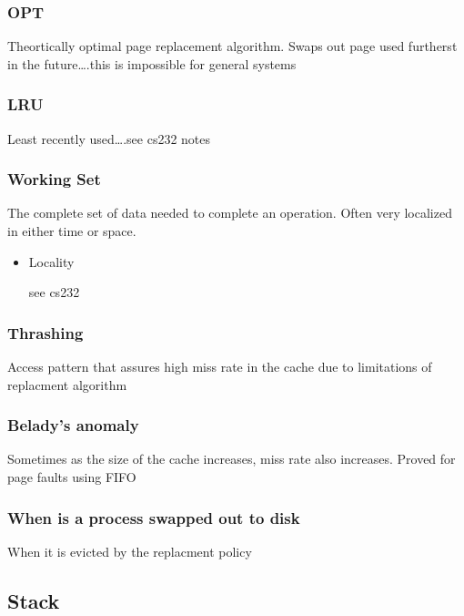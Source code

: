 \documentclass[11pt]{article}
\begin{document}
\subsubsection{OPT}
\label{sec-5.2.1}

    Theortically optimal page replacement algorithm. Swaps out page
    used furtherst in the future\ldots{}.this is impossible for general systems
\subsubsection{LRU}
\label{sec-5.2.2}

    Least recently used\ldots{}.see cs232 notes
\subsubsection{Working Set}
\label{sec-5.2.3}

    The complete set of data needed to complete an operation. Often
    very localized in either time or space.
\begin{itemize}

\item Locality\\
\label{sec-5.2.3.1}

     see cs232
\end{itemize} %
\subsubsection{Thrashing}
\label{sec-5.2.4}

    Access pattern that assures high miss rate in the cache due to
    limitations of replacment algorithm
\subsubsection{Belady's anomaly}
\label{sec-5.2.5}

    Sometimes as the size of the cache increases, miss rate also
    increases. Proved for page faults using FIFO
\subsubsection{When is a process swapped out to disk}
\label{sec-5.2.6}

    When it is evicted by the replacment policy
    
\subsection{Stack}
\label{sec-5.3}
\end{document}
